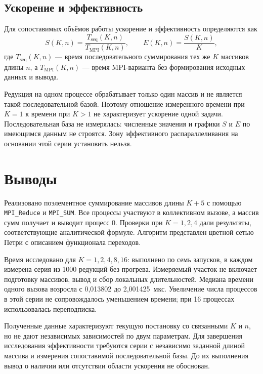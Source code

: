\documentclass[14pt,a4paper]{extarticle}
\begin{document}
\subsection{Ускорение и эффективность}

Для сопоставимых объёмов работы ускорение и эффективность определяются
как
\begin{equation}
 S(K,n)=\frac{T_{\mathrm{seq}}(K,n)}{T_{\mathrm{MPI}}(K,n)},
 \qquad E(K,n)=\frac{S(K,n)}{K},
\end{equation}
где $T_{\mathrm{seq}}(K,n)$ — время последовательного суммирования тех же
$K$ массивов длины $n$, а $T_{\mathrm{MPI}}(K,n)$ — время MPI-варианта
без формирования исходных данных и вывода.

Редукция на одном процессе обрабатывает только один массив и не является
такой последовательной базой. Поэтому отношение измеренного времени
при $K=1$ к времени при $K>1$ не характеризует ускорение одной задачи.
Последовательная база не измерялась: численные значения и графики
$S$ и $E$ по имеющимся данным не строятся. Зону эффективного
распараллеливания на основании этой серии установить нельзя.

\section{Выводы}

Реализовано поэлементное суммирование массивов длины $K+5$
с помощью \texttt{MPI\_Reduce} и \texttt{MPI\_SUM}. Все процессы
участвуют в коллективном вызове, а массив сумм получает и выводит
процесс 0. Проверки при $K=1,2,4$ дали результаты, соответствующие
аналитической формуле. Алгоритм представлен цветной сетью Петри
с описанием функционала переходов.

Время исследовано для $K=1,2,4,8,16$: выполнено по семь запусков,
в каждом измерена серия из 1000 редукций без прогрева. Измеряемый участок
не включает подготовку массивов, вывод и сбор локальных длительностей.
Медиана времени одного вызова возросла с 0,013802 до 2,001425~мкс.
Увеличение числа процессов в этой серии не сопровождалось уменьшением
времени; при 16 процессах использовалась переподписка.

Полученные данные характеризуют текущую постановку со связанными
$K$ и $n$, но не дают независимых зависимостей по двум параметрам.
Для завершения исследования эффективности требуются серии
с независимо заданной длиной массива и измерения сопоставимой
последовательной базы. До их выполнения вывод о наличии или отсутствии
области ускорения не обоснован.
\end{document}
